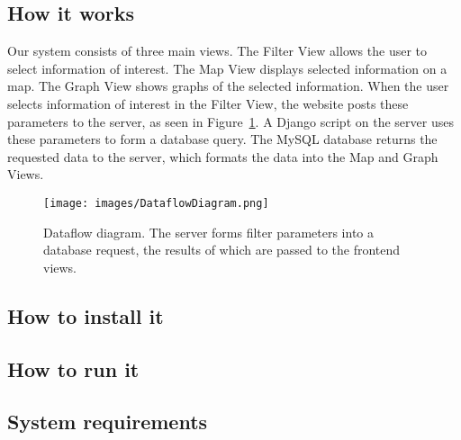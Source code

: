 
\subsection{How it works}
Our system consists of three main views.
The Filter View allows the user to select information of interest.
The Map View displays selected information on a map.
The Graph View shows graphs of the selected information.
When the user selects information of interest in the Filter View, the website posts these parameters to the server, as seen in Figure~\ref{fig:dataflow}.
A Django script on the server uses these parameters to form a database query.
The MySQL database returns the requested data to the server, which formats the data into the Map and Graph Views.

\begin{figure}[h]
\centering
\texttt{[image: images/DataflowDiagram.png]}
\captionsetup{justification=centering}
\caption{
  Dataflow diagram.
  The server forms filter parameters into a database request, the results of which are passed to the frontend views.
}
\label{fig:dataflow}
\end{figure}

\subsection{How to install it}

\subsection{How to run it}

\subsection{System requirements}
